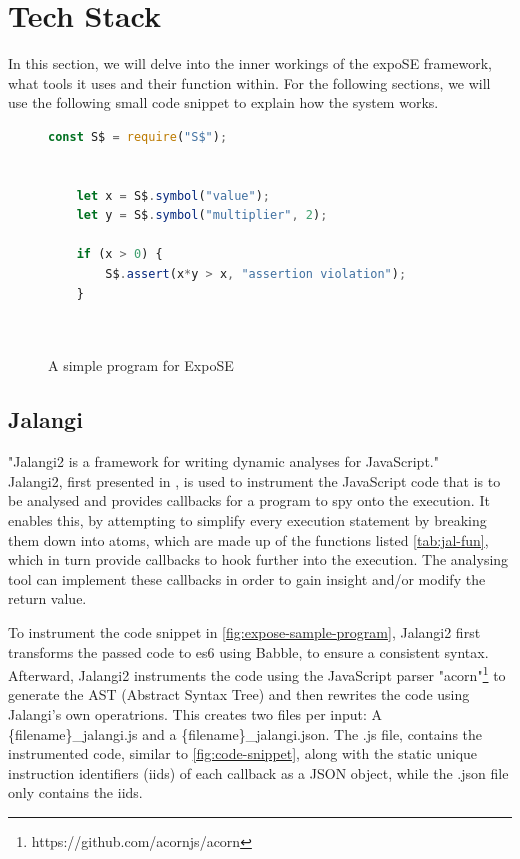 \section{Tech Stack}
\label{sec:tech}
In this section, we will delve into the inner workings of the expoSE framework, what tools it uses and their function within. 
For the following sections, we will use the following small code snippet to explain how the system works. 


\begin{figure}[h]
    \begin{lstlisting}[language=JavaScript, gobble=4]
    const S$ = require("S$");
    

    let x = S$.symbol("value"); 
    let y = S$.symbol("multiplier", 2);
    
    if (x > 0) {
        S$.assert(x*y > x, "assertion violation"); 
    }
    
   
    \end{lstlisting}
    \caption{A simple program for ExpoSE}
    \label{fig:expose-sample-program}
\end{figure}



\subsection{Jalangi}
\label{sec:jalangi}
"Jalangi2 is a framework for writing dynamic analyses for JavaScript." \cite{noauthor_samsungjalangi2_nodate}\\
Jalangi2, first presented in \citet{sen_jalangi_2013}, is used to instrument the JavaScript code that is to be analysed and provides callbacks for a program to spy onto the execution.
It enables this, by attempting to simplify every execution statement by breaking them down into atoms, which are made up of the functions listed \autoref{tab:jal-fun}, which in turn provide callbacks to hook further into the execution.
The analysing tool can implement these callbacks in order to gain insight and/or modify the return value.


To instrument the code snippet in \autoref{fig:expose-sample-program}, Jalangi2 first transforms the passed code to es6 using Babble, to ensure a consistent syntax. 
Afterward, Jalangi2 instruments the code using the JavaScript parser "acorn"\footnote{https://github.com/acornjs/acorn} to generate the AST (Abstract Syntax Tree) and then rewrites the code using Jalangi's own operatrions. This creates two files per input: 
A \{filename\}\_jalangi.js and a \{filename\}\_jalangi.json. The .js file, contains the instrumented code, similar to \autoref{fig:code-snippet}, along with the static unique instruction identifiers (iids) of each callback as a JSON object, while the .json file only contains the iids.

